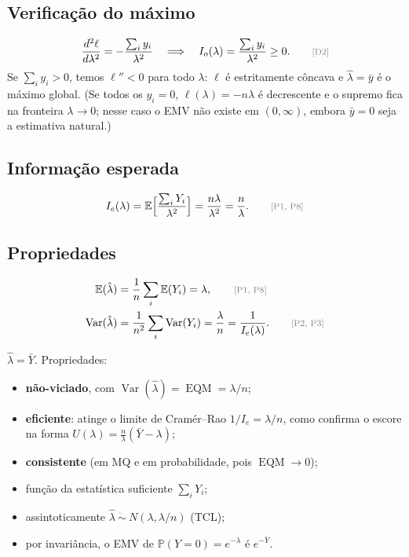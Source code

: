 \documentclass[11pt,a4paper]{article}
\newcommand{\E}{\mathbb{E}}
\newcommand{\Var}{\operatorname{Var}}
\newcommand{\EQM}{\operatorname{EQM}}
\newcommand{\Prob}{\mathbb{P}}
\newcommand{\bY}{\bar{Y}}
\newcommand{\just}[1]{\tag*{\footnotesize\textcolor{gray}{[#1]}}}
\theoremstyle{definition}
\theoremstyle{plain}
\begin{document}
\subsection*{Verificação do máximo}
\[
\frac{d^2\ell}{d\lambda^2}=-\frac{\sum_iy_i}{\lambda^2}\quad\Longrightarrow\quad I_o(\lambda)=\frac{\sum_iy_i}{\lambda^2}\ge0 . \just{D2}
\]
Se $\sum_iy_i>0$, temos $\ell''<0$ para todo $\lambda$: $\ell$ é estritamente côncava e $\hat\lambda=\bar y$ é o máximo global. (Se todos os $y_i=0$, $\ell(\lambda)=-n\lambda$ é decrescente e o supremo fica na fronteira $\lambda\to0$; nesse caso o EMV não existe em $(0,\infty)$, embora $\bar y=0$ seja a estimativa natural.)

\subsection*{Informação esperada}
\[
I_e(\lambda)=\E\Big[\frac{\sum_iY_i}{\lambda^2}\Big]=\frac{n\lambda}{\lambda^2}=\frac{n}{\lambda}. \just{P1, P8}
\]

\subsection*{Propriedades}
\begin{align*}
\E(\hat\lambda)&=\frac1n\sum_i\E(Y_i)=\lambda, \just{P1, P8}\\
\Var(\hat\lambda)&=\frac1{n^2}\sum_i\Var(Y_i)=\frac{\lambda}{n}=\frac{1}{I_e(\lambda)}. \just{P2, P3}
\end{align*}
\begin{resposta}
$\hat\lambda=\bY$. Propriedades:
\begin{itemize}[leftmargin=1.2em]
\item \textbf{não-viciado}, com $\Var(\hat\lambda)=\EQM=\lambda/n$;
\item \textbf{eficiente}: atinge o limite de Cramér--Rao $1/I_e=\lambda/n$, como confirma o escore na forma $U(\lambda)=\frac{n}{\lambda}(\bY-\lambda)$;
\item \textbf{consistente} (em MQ e em probabilidade, pois $\EQM\to0$);
\item função da estatística suficiente $\sum_iY_i$;
\item assintoticamente $\hat\lambda\ \dot\sim\ N(\lambda,\lambda/n)$ (TCL);
\item por invariância, o EMV de $\Prob(Y=0)=e^{-\lambda}$ é $e^{-\bY}$.
\end{itemize}
\end{resposta}
\end{document}
